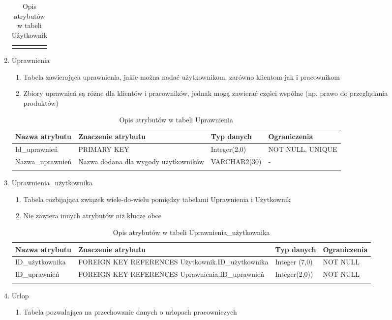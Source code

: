 \begin{enumerate}
{\begin{longtable}{|p{3cm}|p{5cm}|p{2.5cm}|p{2.5cm}|}
    \hline
	\caption{Opis atrybutów w tabeli Użytkownik}
	\end{longtable}}
 \item Uprawnienia
  	\begin{enumerate}
  	  \item Tabela zawierająca uprawnienia, jakie można nadać użytkownikom,
  	  zarówno klientom jak i pracownikom
  	  \item Zbiory uprawnień są różne dla klientów i pracowników, jednak mogą
  	  zawierać części wspólne (np. prawo do przeglądania produktów)
  	\end{enumerate}
  	{\footnotesize
  	\begin{longtable}{|p{3cm}|p{5cm}|p{2.5cm}|p{2.5cm}|}
  	\hline
  	\textbf{Nazwa atrybutu} & \textbf{Znaczenie atrybutu} & \textbf{Typ danych} &
  	\textbf{Ograniczenia} \\
  	\hline
  	Id\_uprawnień & PRIMARY KEY & Integer(2,0) & NOT NULL, UNIQUE \\
  	\hline
  	Nazwa\_uprawnień & Nazwa dodana dla wygody użytkowników & VARCHAR2(30) & - 
  	\\
  	\hline
	\caption{Opis atrybutów w tabeli Uprawnienia}
	\end{longtable}}
  \item Uprawnienia\_użytkownika
  	\begin{enumerate}
  	  \item Tabela rozbijająca związek wiele-do-wielu pomiędzy tabelami
  	  Uprawnienia i Użytkownik
  	  \item Nie zawiera innych atrybutów niż klucze obce
  	\end{enumerate}
  	{\footnotesize
  	\begin{longtable}{|p{3cm}|p{5cm}|p{2.5cm}|p{2.5cm}|}
  	\hline
  	\textbf{Nazwa atrybutu} & \textbf{Znaczenie atrybutu} & \textbf{Typ danych} &
  	\textbf{Ograniczenia} \\
  	\hline
  	ID\_użytkownika & FOREIGN KEY REFERENCES Użytkownik.ID\_użytkownika  &
  	Integer (7,0) & NOT NULL
  	\\
  	\hline
  	ID\_uprawnień & FOREIGN KEY REFERENCES Uprawnienia.ID\_uprawnień &
  	Integer(2,0)) & NOT NULL
  	\\
  	\hline
	\caption{Opis atrybutów w tabeli Uprawnienia\_użytkownika}
	\end{longtable}}
  \item Urlop
  	\begin{enumerate}
  	  \item Tabela pozwalająca na przechowanie danych o urlopach pracowniczych

\end{enumerate}
\end{enumerate}
